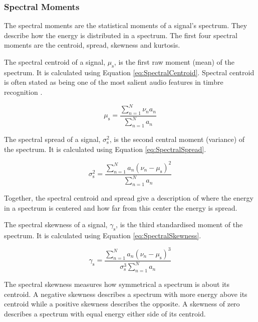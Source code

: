		\subsubsection*{Spectral Moments}
			The spectral moments are the statistical moments of a signal's spectrum. They describe how the
			energy is distributed in a spectrum. The first four spectral moments are the centroid, spread,
			skewness and kurtosis.

			The spectral centroid of a signal, $\mu_{\mathrm{s}}$, is the first raw moment (mean) of the
			spectrum. It is calculated using Equation \ref{eq:SpectralCentroid}. Spectral centroid is often
			stated as being one of the most salient audio features in timbre recognition
			\citep{freed1990auditory, lakatos2000a}. 

			\begin{equation}
				\mu_{\mathrm{s}} = \frac{\sum_{n = 1}^{N} \nu_{n}a_{n}}
					   	   {\sum_{n = 1}^{N} a_{n}}
				\label{eq:SpectralCentroid}
			\end{equation}

			The spectral spread of a signal, $\sigma_{\mathrm{s}}^{2}$, is the second central moment (variance)
			of the spectrum. It is calculated using Equation \ref{eq:SpectralSpread}.

			\begin{equation}
				\sigma_{\mathrm{s}}^{2} = \frac{\sum_{n = 1}^{N} a_{n}(\nu_{n} - \mu_{\mathrm{s}})^{2}}
						  	  {\sum_{n = 1}^{N} a_{n}}
				\label{eq:SpectralSpread}
			\end{equation}

			Together, the spectral centroid and spread give a description of where the energy in a spectrum is
			centered and how far from this center the energy is spread.

			The spectral skewness of a signal, $\gamma_{\mathrm{s}}$, is the third standardised moment of the
			spectrum. It is calculated using Equation \ref{eq:SpectralSkewness}.

			\begin{equation}
				\gamma_{\mathrm{s}} = \frac{\sum_{n = 1}^{N} a_{n}(\nu_{n} - \mu_{\mathrm{s}})^{3}}
					{\sigma_{\mathrm{s}}^{3}\sum_{n = 1}^{N} a_{n}}
				\label{eq:SpectralSkewness}
			\end{equation}

			The spectral skewness measures how symmetrical a spectrum is about its centroid. A negative
			skewness describes a spectrum with more energy above its centroid while a positive skewness
			describes the opposite. A skewness of zero describes a spectrum with equal energy either side of
			its centroid.

